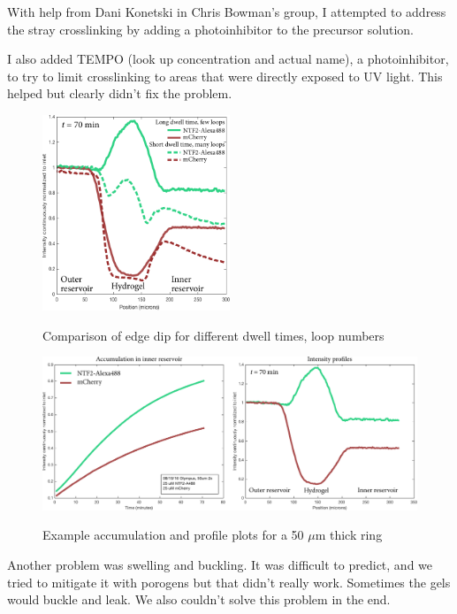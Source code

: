 With help from Dani Konetski in Chris Bowman's group, I attempted to address the stray crosslinking by adding a photoinhibitor to the precursor solution.

 I also added TEMPO (look up concentration and actual name), a photoinhibitor, to try to limit crosslinking to areas that were directly exposed to UV light.  This helped but clearly didn't fix the problem.  

\begin{figure} %
\caption{Comparison of edge dip for different dwell times, loop numbers}
\centering
\includegraphics[width=0.5\textwidth]{figs/ch03/dwell-time-effect}
\label{fig:dwell-time-effect}
\end{figure} %

\begin{figure} %
\caption{Example accumulation and profile plots for a 50 $\mu$m thick ring}
\centering
\includegraphics[width=\textwidth]{figs/ch03/ring-acc-and-profile}
\label{fig:ring-acc-and-profile}
\end{figure} %


Another problem was swelling and buckling.  It was difficult to predict, and we tried to mitigate it with porogens but that didn't really work.  Sometimes the gels would buckle and leak.  We also couldn't solve this problem in the end.

